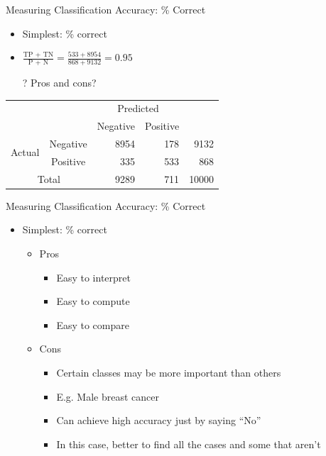 \documentclass[aspectratio=169]{beamer}
\begin{document}
\begin{frame}{Measuring Classification Accuracy: \% Correct}

\begin{itemize}
\item Simplest: \% correct
\item $\frac{\textrm{TP + TN}}{\textrm{P + N}} = \frac{533+8954}{868 + 9132} = 0.95$

	\item[?] Pros and cons?
\end{itemize}

\begin{tabular}{|c|c|r|r|r|} \hline
\multicolumn{2}{|c|}{}   &   \multicolumn{2}{c|}{Predicted}  & \\ \cline{3-4}
\multicolumn{2}{|c|}{} & Negative & Positive  & \\ \hline  
\multirow{2}{*}{Actual} & Negative & 8954 & 178  & 9132 \\ \cline{2-5}
 & Positive & 335 & 533  & 868 \\ \hline \hline
 \multicolumn{2}{|c|}{Total} & 9289 & 711  & 10000\\ \hline
 \end{tabular}

\end{frame}
\begin{frame}{Measuring Classification Accuracy: \% Correct}

\begin{itemize}
\item Simplest: \% correct
	\begin{itemize}
	\item Pros
		\begin{itemize}
		\item Easy to interpret
		\item Easy to compute
		\item Easy to compare
		\end{itemize}
	\item Cons
		\begin{itemize}
		\item Certain classes may be more important than others
		\item E.g. Male breast cancer
		\item Can achieve high accuracy just by saying ``No''
		\item In this case, better to find all the cases and some that aren't
		\end{itemize}
	\end{itemize}
\end{itemize}
\end{frame}
\end{document}
